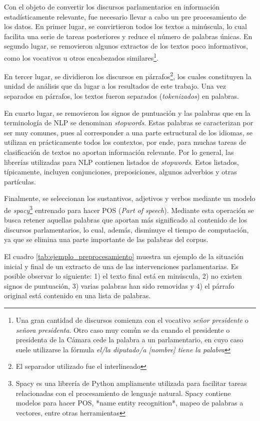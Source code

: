 \documentclass[
  12pt,
]{article}
\begin{document}
Con el objeto de convertir los discursos parlamentarios en información
estadísticamente relevante, fue necesario llevar a cabo un pre
procesamiento de los datos. En primer lugar, se convirtieron todos los
textos a minúscula, lo cual facilita una serie de tareas posteriores y
reduce el número de palabras únicas. En segundo lugar, se removieron
algunos extractos de los textos poco informativos, como los vocativos u
otros encabezados
similares\footnote{Una gran cantidad de discursos comienza con el vocativo  \textit{señor presidente} o \textit{señora presidenta}. Otro caso muy común se da cuando el presidente o presidenta de la Cámara cede la palabra a un parlamentario, en cuyo caso suele utilizarse la fórmula \textit{el/la diputado/a [nombre] tiene la palabra}}.

En tercer lugar, se dividieron los discursos en
párrafos\footnote{El separador utilizado fue el interlineado}, los
cuales constituyen la unidad de análisis que da lugar a los resultados
de este trabajo. Una vez separados en párrafos, los textos fueron
separados (\emph{tokenizados}) en palabras.

En cuarto lugar, se removieron los signos de puntuación y las palabras
que en la terminología de NLP se denominan \emph{stopwords}. Estas
palabras se caracterizan por ser muy comunes, pues al corresponder a una
parte estructural de los idiomas, se utilizan en prácticamente todos los
contextos, por ende, para muchas tareas de clasificación de textos no
aportan información relevante. Por lo general, las librerías utilizadas
para NLP contienen listados de \emph{stopwords}. Estos listados,
típicamente, incluyen conjunciones, preposiciones, algunos adverbios y
otras partículas.

Finalmente, se seleccionan los sustantivos, adjetivos y verbos mediante
un modelo de
\emph{spacy}\footnote{Spacy es una librería de Python ampliamente utilizada para facilitar tareas relacionadas con el procesamiento de lenguaje natural. Spacy contiene modelos para hacer POS, *name entity recognition*, mapeo de palabras a vectores, entre otras herramientas}
entrenado para hacer POS (\emph{Part of speech}). Mediante esta
operación se busca retener aquellas palabras que aportan más significado
al contenido de los discursos parlamentarios, lo cual, además, disminuye
el tiempo de computación, ya que se elimina una parte importante de las
palabras del corpus.

El cuadro \ref{tab:ejemplo_preprocesamiento} muestra un ejemplo de la
situación inicial y final de un extracto de una de las intervenciones
parlamentarias. Es posible observar lo siguiente: 1) el texto final está
en minúscula, 2) no existen signos de puntuación, 3) varias palabras han
sido removidas y 4) el párrafo original está contenido en una lista de
palabras.
\end{document}
